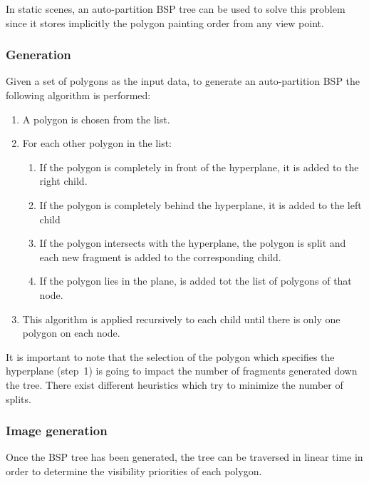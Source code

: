 \documentclass{article}
\begin{document}
In static scenes, an auto-partition BSP tree can be used to solve this problem since it stores implicitly the polygon painting order from any view point.

\subsubsection*{Generation}
Given a set of polygons as the input data, to generate an auto-partition BSP the following algorithm is performed:
\begin{enumerate}
\item A polygon is chosen from the list.
\item For each other polygon in the list:
\begin{enumerate}
\item If the polygon is completely in front of the hyperplane, it is added to the right child.
\item If the polygon is completely behind the hyperplane, it is added to the left child
\item If the polygon intersects with the hyperplane, the polygon is split and each new fragment is added to the corresponding child.
\item If the polygon lies in the plane, is added tot the list of polygons of that node.
\end{enumerate}
\item This algorithm is applied recursively to each child until there is only one polygon on each node.
\end{enumerate}

It is important to note that the selection of the polygon which specifies the hyperplane (step~1) is going to impact the number of fragments generated down the tree. There exist different heuristics which try to minimize the number of splits.

\subsubsection*{Image generation}
Once the BSP tree has been generated, the tree can be traversed in linear time in order to determine the visibility priorities of each polygon.
\end{document}
